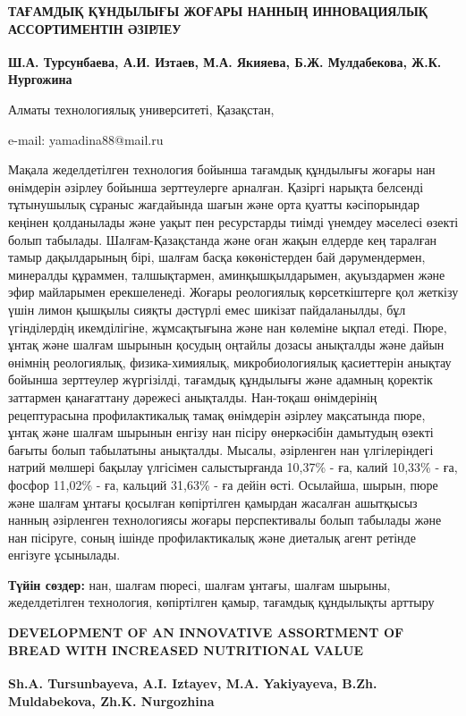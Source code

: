 \begin{articleheader}
{\bfseries ТАҒАМДЫҚ ҚҰНДЫЛЫҒЫ ЖОҒАРЫ НАННЫҢ ИННОВАЦИЯЛЫҚ АССОРТИМЕНТІН ӘЗІРЛЕУ}

{\bfseries
Ш.А. Турсунбаева,
А.И. Изтаев,
М.А. Якияева\textsuperscript{\envelope },
Б.Ж. Мулдабекова,
Ж.К. Нургожина
}
\end{articleheader}

\begin{affiliation}
Алматы технологиялық университеті, Қазақстан,

e-mail: yamadina88@mail.ru
\end{affiliation}

Мақала жеделдетілген технология бойынша тағамдық құндылығы жоғары нан
өнімдерін әзірлеу бойынша зерттеулерге арналған. Қазіргі нарықта
белсенді тұтынушылық сұраныс жағдайында шағын және орта қуатты
кәсіпорындар кеңінен қолданылады және уақыт пен ресурстарды тиімді
үнемдеу мәселесі өзекті болып табылады. Шалғам-Қазақстанда және оған
жақын елдерде кең таралған тамыр дақылдарының бірі, шалғам басқа
көкөністерден бай дәрумендермен, минералды құраммен, талшықтармен,
аминқышқылдарымен, ақуыздармен және эфир майларымен ерекшеленеді. Жоғары
реологиялық көрсеткіштерге қол жеткізу үшін лимон қышқылы сияқты
дәстүрлі емес шикізат пайдаланылды, бұл үгінділердің икемділігіне,
жұмсақтығына және нан көлеміне ықпал етеді. Пюре, ұнтақ және шалғам
шырынын қосудың оңтайлы дозасы анықталды және дайын өнімнің реологиялық,
физика-химиялық, микробиологиялық қасиеттерін анықтау бойынша зерттеулер
жүргізілді, тағамдық құндылығы және адамның қоректік заттармен
қанағаттану дәрежесі анықталды. Нан-тоқаш өнімдерінің рецептурасына
профилактикалық тамақ өнімдерін әзірлеу мақсатында пюре, ұнтақ және
шалғам шырынын енгізу нан пісіру өнеркәсібін дамытудың өзекті бағыты
болып табылатыны анықталды. Мысалы, әзірленген нан үлгілеріндегі натрий
мөлшері бақылау үлгісімен салыстырғанда 10,37\% - ға, калий 10,33\% -
ға, фосфор 11,02\% - ға, кальций 31,63\% - ға дейін өсті. Осылайша,
шырын, пюре және шалғам ұнтағы қосылған көпіртілген қамырдан жасалған
ашытқысыз нанның әзірленген технологиясы жоғары перспективалы болып
табылады және нан пісіруге, соның ішінде профилактикалық және диеталық
агент ретінде енгізуге ұсынылады.

{\bfseries Түйін сөздер:} нан, шалғам пюресі, шалғам ұнтағы, шалғам шырыны,
жеделдетілген технология, көпіртілген қамыр, тағамдық құндылықты арттыру

\begin{articleheader}
{\bfseries DEVELOPMENT OF AN INNOVATIVE ASSORTMENT OF BREAD WITH INCREASED
NUTRITIONAL VALUE}

{\bfseries
Sh.A. Tursunbayeva,
A.I. Iztayev,
M.A. Yakiyayeva\textsuperscript{\envelope },
B.Zh. Muldabekova,
Zh.K. Nurgozhina
}
\end{articleheader}

